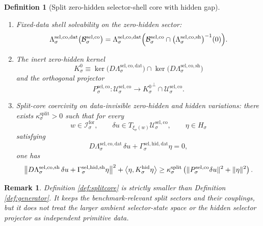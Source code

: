 \documentclass[11pt]{article}
\newcommand{\ForSpace}[1]{\mathcal I_{#1}^{\mathrm{for}}}
\newcommand{\Reduction}[1]{\mathcal R_{#1}}
\newcommand{\CurrentCarrier}[1]{\mathfrak C_{#1}^{\mathrm{cur}}}
\newcommand{\EqCarrier}[1]{\mathfrak C_{#1}^{\mathrm{eq}}}
\newcommand{\GapSpace}[1]{H_{#1}}
\newcommand{\HiddenOperator}[1]{K_{#1}^{\mathrm{hid}}}
\newcommand{\Kernel}[1]{K_{#1}^{0}}
\newcommand{\SelCoreSpace}[1]{\mathcal U_{#1}^{\mathrm{sel,co}}}
\newcommand{\SelCoreBody}[1]{\mathcal B_{#1}^{\mathrm{sel,co}}}
\newcommand{\SelCoreData}[1]{\Lambda_{#1}^{\mathrm{sel,co,dat}}}
\newcommand{\SelCoreShell}[1]{\Lambda_{#1}^{\mathrm{sel,co,sh}}}
\newcommand{\SelHiddenData}[1]{\Gamma_{#1}^{\mathrm{sel,hid,dat}}}
\newcommand{\SelHiddenShell}[1]{\Gamma_{#1}^{\mathrm{sel,hid,sh}}}
\newcommand{\SelCoreEmbed}[1]{\xi_{#1}}
\newcommand{\SelCoreProj}[1]{P_{#1}^{\mathrm{sel,co}}}
\newtheorem{definition}{Definition}
\newtheorem{remark}{Remark}
\begin{document}
\begin{definition}[Split zero-hidden selector-shell core with hidden gap]
\begin{enumerate}
    \[
    \SelCoreEmbed{\sigma}:\ForSpace{\sigma}\hookrightarrow\SelCoreSpace{\sigma}
    \]
    whose image is exactly
    \[
    \SelCoreBody{\sigma}\cap
    \bigl(\SelCoreShell{\sigma}\bigr)^{-1}(0),
    \]
    and such that
    \begin{equation}
    \SelCoreData{\sigma}\bigl(\SelCoreEmbed{\sigma}(w)\bigr)
    =
    \bigl(
    \jmath_{\sigma}(\Reduction{\sigma}(w)),
    \CurrentCarrier{\sigma}(w),
    \EqCarrier{\sigma}(w)
    \bigr)
    \label{eq:splitcompat}
    \end{equation}
    for every \(w\in\ForSpace{\sigma}\).
    \item Fixed-data shell solvability on the zero-hidden sector:
    \begin{equation}
    \SelCoreData{\sigma}\bigl(\SelCoreBody{\sigma}\bigr)
    =
    \SelCoreData{\sigma}\Bigl(
    \SelCoreBody{\sigma}\cap
    \bigl(\SelCoreShell{\sigma}\bigr)^{-1}(0)
    \Bigr).
    \label{eq:splitsolvability}
    \end{equation}
    \item The inert zero-hidden kernel
    \[
    \Kernel{\sigma}
    \equiv
    \ker\bigl(D\SelCoreData{\sigma}\bigr)
    \cap
    \ker\bigl(D\SelCoreShell{\sigma}\bigr)
    \]
    and the orthogonal projector
    \[
    \SelCoreProj{\sigma}:
    \SelCoreSpace{\sigma}\to
    {\Kernel{\sigma}}^{\perp}\cap\SelCoreSpace{\sigma}.
    \]
    \item Split-core coercivity on data-invisible zero-hidden and hidden variations: there exists \(\kappa_{\sigma}^{\mathrm{split}}>0\) such that for every
    \[
    w\in\ForSpace{\sigma},
    \qquad
    \delta u\in T_{\SelCoreEmbed{\sigma}(w)}\SelCoreSpace{\sigma},
    \qquad
    \eta\in\GapSpace{\sigma}
    \]
    satisfying
    \[
    D\SelCoreData{\sigma}\,\delta u+\SelHiddenData{\sigma}\eta=0,
    \]
    one has
    \begin{equation}
    \bigl\|
    D\SelCoreShell{\sigma}\,\delta u+\SelHiddenShell{\sigma}\eta
    \bigr\|^{2}
    +
    \ev{\eta,\HiddenOperator{\sigma}\eta}
    \ge
    \kappa_{\sigma}^{\mathrm{split}}
    \left(
    \|\SelCoreProj{\sigma}\delta u\|^{2}
    +
    \|\eta\|^{2}
    \right).
    \label{eq:splitcoercive}
    \end{equation}
\end{enumerate}
\end{definition}

\begin{remark}
Definition \ref{def:splitcore} is strictly smaller than Definition \ref{def:generator}. It keeps the benchmark-relevant split sectors and their couplings, but it does not treat the larger ambient selector-state space or the hidden selector projector as independent primitive data.
\end{remark}
\end{document}
